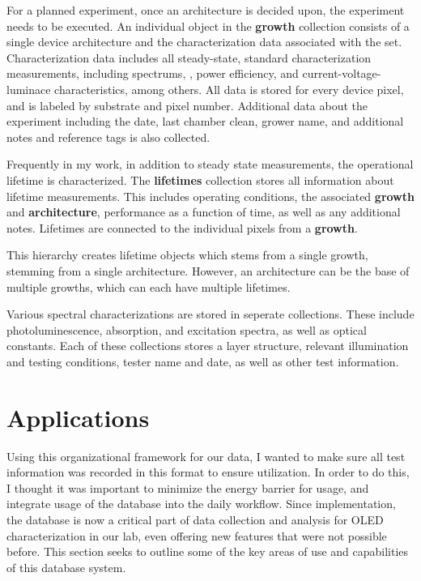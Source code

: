 \documentclass[../thesis.tex]{subfiles}
\begin{document}
For a planned experiment, once an architecture is decided upon, the experiment needs to be executed.
An individual object in the \textbf{growth} collection consists of a single device architecture and the characterization data associated with the set.
Characterization data includes all steady-state, standard characterization measurements, including spectrums, \eqe, power efficiency,  and current-voltage-luminace characteristics, among others.
All data is stored for every device pixel, and is labeled by substrate and pixel number.
Additional data about the experiment including the date, last chamber clean, grower name, and additional notes and reference tags is also collected.

Frequently in my work, in addition to steady state measurements, the operational lifetime is characterized.
The \textbf{lifetimes} collection stores all information about lifetime measurements.
This includes operating conditions, the associated \textbf{growth} and \textbf{architecture}, performance as a function of time, as well as any additional notes.
Lifetimes are connected to the individual pixels from a \textbf{growth}.

This hierarchy creates lifetime objects which stems from a single growth, stemming from a single architecture.  
However, an architecture can be the base of multiple growths, which can each have multiple lifetimes.  

Various spectral characterizations are stored in seperate collections.  These include photoluminescence, absorption, and excitation spectra, as well as optical constants.
Each of these collections stores a layer structure, relevant illumination and testing conditions, tester name and date, as well as other test information.

\section{Applications}

Using this organizational framework for our data, I wanted to make sure all test information was recorded in this format to ensure utilization.
In order to do this, I thought it was important to minimize the energy barrier for usage, and integrate usage of the database into the daily workflow.
Since implementation, the database is now a critical part of data collection and analysis for OLED characterization in our lab, even offering new features that were not possible before.
This section seeks to outline some of the key areas of use and capabilities of this database system.
\end{document}
